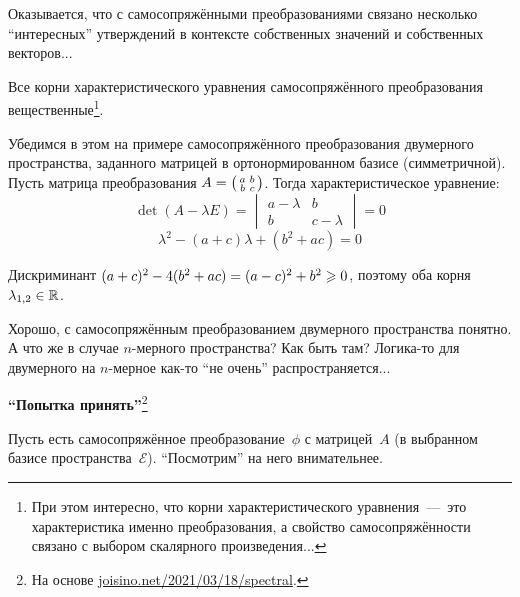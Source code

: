 \documentclass[a4paper,12pt]{article}
\theoremstyle{remark}
\begin{document}
  \medskip
  
  Оказывается, что с самосопряжёнными преобразованиями связано несколько ``интересных'' утверждений в контексте собственных значений и собственных векторов...
  
  \begin{theorem}\label{theo:real-roots}
    Все корни характеристического уравнения самосопряжённого преобразования вещественные\footnote{При этом интересно, что корни характеристического уравнения~---~это характеристика именно преобразования, а свойство самосопряжённости связано с выбором скалярного произведения...}.
  \end{theorem}
  
  \begin{example}
    Убедимся в этом на примере самосопряжённого преобразования двумерного пространства, заданного матрицей в ортонормированном базисе (симметричной).
    Пусть матрица преобразования $A \hm= \left(\begin{smallmatrix}a & b\\ b & c\end{smallmatrix}\right)$.
    Тогда характеристическое уравнение:
    \[
      \det(A - \lambda E) = \begin{vmatrix}
        a - \lambda & b\\
        b & c - \lambda
      \end{vmatrix} = 0
    \]
    \[
      \lambda^2 - (a + c) \lambda + (b^2 + ac) = 0
    \]
    
    Дискриминант $(a \hm+ c)^2 \hm- 4(b^2 \hm+ ac) \hm= (a \hm- c)^2 \hm+ b^2 \hm\geq 0$, поэтому оба корня $\lambda_{1, 2} \hm\in \RR$.
  \end{example}
  
  Хорошо, с самосопряжённым преобразованием двумерного пространства понятно.
  А что же в случае $n$-мерного пространства?
  Как быть там?
  Логика-то для двумерного на $n$-мерное как-то ``не очень'' распространяется...
  

  \newpage
  
  \noindent
  \textbf{``Попытка принять''}\footnote{На основе \href{https://joisino.net/2021/03/18/spectral}{joisino.net/2021/03/18/spectral}.}

  Пусть есть самосопряжённое преобразование~$\phi$ с матрицей~$A$ (в выбранном базисе пространства~$\mathcal E$).
  ``Посмотрим'' на него внимательнее.
  
\end{document}
